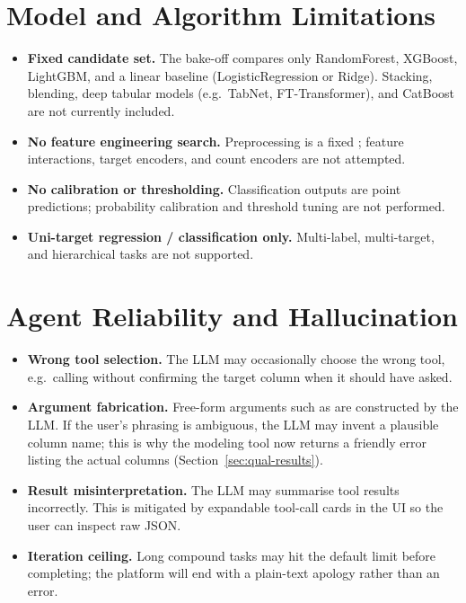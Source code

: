\section{Model and Algorithm Limitations}
\label{sec:lim-models}

\begin{itemize}[leftmargin=1.4em]
  \item \textbf{Fixed candidate set.} The bake-off compares only
        RandomForest, XGBoost, LightGBM, and a linear baseline
        (LogisticRegression or Ridge). Stacking, blending, deep
        tabular models (e.g.\ TabNet, FT-Transformer), and
        CatBoost are not currently included.
  \item \textbf{No feature engineering search.} Preprocessing is a
        fixed ; feature interactions,
        target encoders, and count encoders are not attempted.
  \item \textbf{No calibration or thresholding.} Classification
        outputs are point predictions; probability calibration and
        threshold tuning are not performed.
  \item \textbf{Uni-target regression / classification only.}
        Multi-label, multi-target, and hierarchical tasks are not
        supported.
\end{itemize}

\section{Agent Reliability and Hallucination}
\label{sec:lim-hallucination}

\begin{itemize}[leftmargin=1.4em]
  \item \textbf{Wrong tool selection.} The LLM may occasionally
        choose the wrong tool, e.g.\ calling
         without confirming the
        target column when it should have asked.
  \item \textbf{Argument fabrication.} Free-form arguments such as
         are constructed by the LLM. If the
        user's phrasing is ambiguous, the LLM may invent a plausible
        column name; this is why the modeling tool now returns a
        friendly error listing the actual columns
        (Section~\ref{sec:qual-results}).
  \item \textbf{Result misinterpretation.} The LLM may summarise
        tool results incorrectly. This is mitigated by expandable
        tool-call cards in the UI so the user can inspect raw JSON.
  \item \textbf{Iteration ceiling.} Long compound tasks may hit the
        default  limit before
        completing; the platform will end with a plain-text apology
        rather than an error.
\end{itemize}

